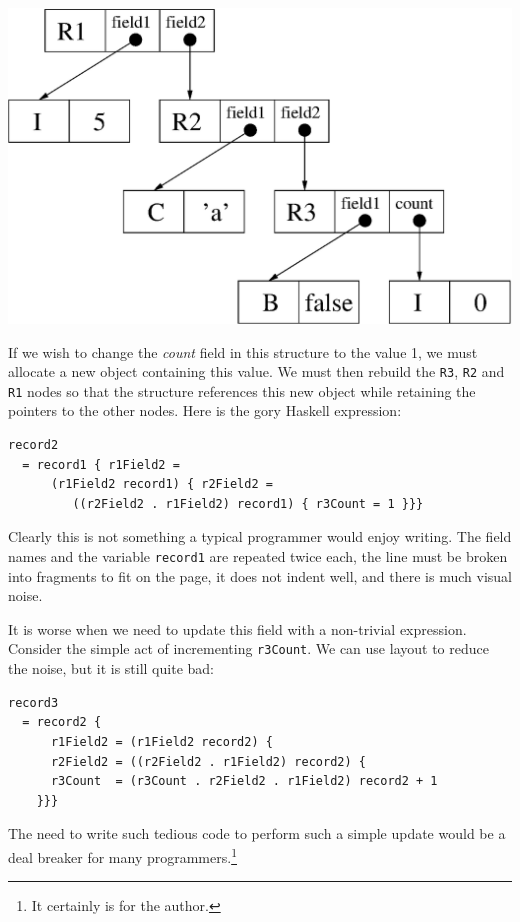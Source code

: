 \clearpage{}
\begin{center}
\includegraphics[scale=0.5]{1-Introduction/fig/destructive/broadcast-record}
\end{center}

If we wish to change the \emph{count} field in this structure to the value 1, we must allocate a new object containing this value. We must then rebuild the \texttt{R3}, \texttt{R2} and \texttt{R1} nodes so that the structure references this new object while retaining the pointers to the other nodes. Here is the gory Haskell expression:

\begin{lstlisting}
record2
  = record1 { r1Field2 = 
      (r1Field2 record1) { r2Field2 = 
         ((r2Field2 . r1Field2) record1) { r3Count = 1 }}}
\end{lstlisting}

Clearly this is not something a typical programmer would enjoy writing. The field names and the variable \texttt{record1} are repeated twice each, the line must be broken into fragments to fit on the page, it does not indent well, and there is much visual noise.

It is worse when we need to update this field with a non-trivial expression. Consider the simple act of incrementing \texttt{r3Count}. We can use layout to reduce the noise, but it is still quite bad:
\begin{lstlisting}
record3
  = record2 { 
      r1Field2 = (r1Field2 record2) {
      r2Field2 = ((r2Field2 . r1Field2) record2) {
      r3Count  = (r3Count . r2Field2 . r1Field2) record2 + 1 
    }}}
\end{lstlisting}
The need to write such tedious code to perform such a simple update would be a deal breaker for many programmers.\footnote{It certainly is for the author.}

